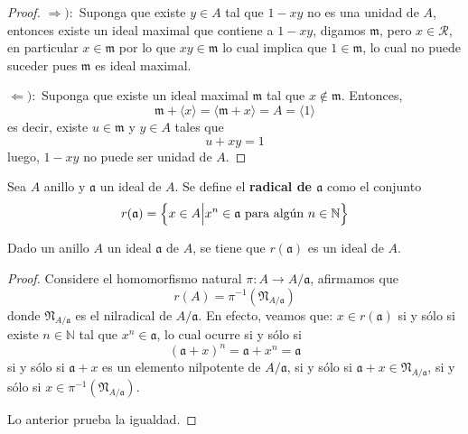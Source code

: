 \documentclass[12pt]{report}
\theoremstyle{largebreak}
\newcommand\cf[3]{\ensuremath{#1:#2\rightarrow#3}}
\begin{document}
    \begin{proof}
        $\Rightarrow):$ Suponga que existe $y\in A$ tal que $1-xy$ no es una unidad de $A$, entonces existe un ideal maximal que contiene a $1-xy$, digamos $\mathfrak{m}$, pero $x\in\mathcal{R}$, en particular $x\in\mathfrak{m}$ por lo que $xy\in\mathfrak{m}$ lo cual implica que $1\in\mathfrak{m}$, lo cual no puede suceder pues $\mathfrak{m}$ es ideal maximal.

        $\Leftarrow):$ Suponga que existe un ideal maximal $\mathfrak{m}$ tal que $x\notin\mathfrak{m}$. Entonces,
        \begin{equation*}
            \mathfrak{m}+\langle x\rangle=\langle\mathfrak{m}+x\rangle=A=\langle 1\rangle
        \end{equation*}
        es decir, existe $u\in\mathfrak{m}$ y $y\in A$ tales que
        \begin{equation*}
            u+xy=1
        \end{equation*}
        luego, $1-xy$ no puede ser unidad de $A$.
    \end{proof}

    \begin{mydef}
        Sea $A$ anillo y $\mathfrak{a}$ un ideal de $A$. Se define el \textbf{radical de $\mathfrak{a}$} como el conjunto
        \begin{equation*}
            r(\mathfrak{a})=\left\{x\in A\Big|x^n\in\mathfrak{a}\textup{ para algún }n\in\mathbb{N} \right\}
        \end{equation*}
    \end{mydef}

    \begin{propo}
        Dado un anillo $A$ un ideal $\mathfrak{a}$ de $A$, se tiene que $r(\mathfrak{a})$ es un ideal de $A$.
    \end{propo}

    \begin{proof}
        Considere el homomorfismo natural $\cf{\pi}{A}{A/\mathfrak{a}}$, afirmamos que
        \begin{equation*}
            r(A)=\pi^{-1}\left(\mathfrak{N}_{ A/\mathfrak{a}} \right)
        \end{equation*}
        donde $\mathfrak{N}_{ A/\mathfrak{a}}$ es el nilradical de $A/\mathfrak{a}$. En efecto, veamos que:
        $x\in r(\mathfrak{a})$ si y sólo si existe $n\in\mathbb{N}$ tal que $x^n\in\mathfrak{a}$, lo cual ocurre si y sólo si
        \begin{equation*}
            \left(\mathfrak{a}+x\right)^n=\mathfrak{a}+x^n=\mathfrak{a}
        \end{equation*}
        si y sólo si $\mathfrak{a}+x$ es un elemento nilpotente de $A/\mathfrak{a}$, si y sólo si $\mathfrak{a}+x\in\mathfrak{N}_{ A/\mathfrak{a}}$, si y sólo si $x\in\pi^{-1}\left(\mathfrak{N}_{ A/\mathfrak{a}} \right)$.

        Lo anterior prueba la igualdad.
    \end{proof}
\end{document}
